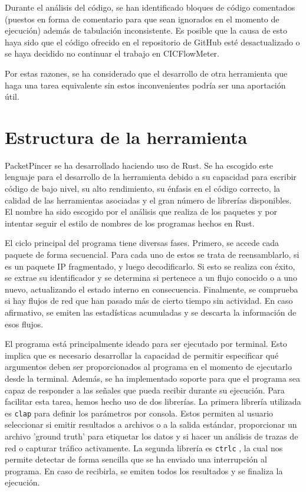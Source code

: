 \documentclass[10pt,a4paper,twoside]{article}
\begin{document}
\begin{multicols*}{2}
    Durante el análisis del código, se han identificado bloques de código comentados (puestos en forma de comentario para que sean ignorados en el momento de ejecución) además de tabulación inconsistente. Es posible que la causa de esto haya sido que el código ofrecido en el repositorio de GitHub esté desactualizado o se haya decidido no continuar el trabajo en CICFlowMeter.

    Por estas razones, se ha considerado que el desarrollo de otra herramienta que haga una tarea equivalente sin estos inconvenientes podría ser una aportación útil.

    \section{Estructura de la herramienta} \label{funcherramienta}

    PacketPincer se ha desarrollado haciendo uso de Rust. Se ha escogido este lenguaje para el desarrollo de la herramienta debido a su capacidad para escribir código de bajo nivel, su alto rendimiento, su énfasis en el código correcto, la calidad de las herramientas asociadas y el gran número de librerías disponibles. El nombre ha sido escogido por el análisis que realiza de los paquetes y por intentar seguir el estilo de nombres de los programas hechos en Rust.

    El ciclo principal del programa tiene diversas fases. Primero, se accede cada paquete de forma secuencial. Para cada uno de estos se trata de reensamblarlo, si es un paquete IP fragmentado, y luego decodificarlo. Si esto se realiza con éxito, se extrae su identificador y se determina si pertenece a un flujo conocido o a uno nuevo, actualizando el estado interno en consecuencia. Finalmente, se comprueba si hay flujos de red que han pasado más de cierto tiempo sin actividad. En caso afirmativo, se emiten las estadísticas acumuladas y se descarta la información de esos flujos.

    El programa está principalmente ideado para ser ejecutado por terminal. Esto implica que es necesario desarrollar la capacidad de permitir especificar qué argumentos deben ser proporcionados al programa en el momento de ejecutarlo desde la terminal. Además, se ha implementado soporte para que el programa sea capaz de responder a las señales que pueda recibir durante su ejecución. Para facilitar esta tarea, hemos hecho uso de dos librerías. La primera librería utilizada es \texttt{clap} \cite{Knapp_clap_2024} para definir los parámetros por consola. Estos permiten al usuario seleccionar si emitir resultados a archivos o a la salida estándar, proporcionar un archivo 'ground truth' para etiquetar los datos y si hacer un análisis de trazas de red o capturar tráfico activamente. La segunda librería es \texttt{ctrlc} \cite{controlc}, la cual nos permite detectar de forma sencilla que se ha enviado una interrupción al programa. En caso de recibirla, se emiten todos los resultados y se finaliza la ejecución.


\end{multicols*}
\end{document}
